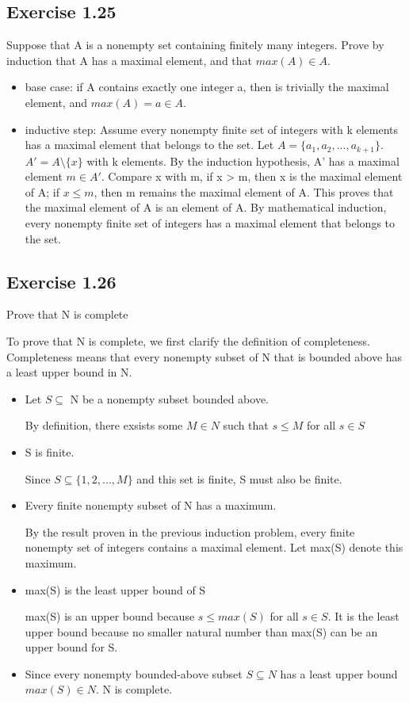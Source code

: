 \documentclass[12pt]{article}
\begin{document}
		\subsection*{Exercise 1.25}
			Suppose that A is a nonempty set containing finitely many integers. Prove by induction that A has a maximal element, and that $max(A) \in A$.
			\begin{itemize}
				\item base case: if A contains exactly one integer a, then is trivially the maximal element, and $max(A) = a \in A$.
				\item inductive step: Assume every nonempty finite set of integers with k elements has a maximal element that belongs to the set. Let $A = \{a_1, a_2, ..., a_{k+1}\}$. $A' = A \setminus \{x\}$ with k elements. By the induction hypothesis, A' has a maximal element $m \in A'$. Compare x with m, if x > m, then x is the maximal element of A; if $x \le m$, then m remains the maximal element of A. This proves that the maximal element of A is an element of A. By mathematical induction, every nonempty finite set of integers has a maximal element that belongs to the set.
			\end{itemize}
		\subsection*{Exercise 1.26}
			Prove that N is complete
			
			To prove that N is complete, we first clarify the definition of completeness. Completeness means that every nonempty subset of N that is bounded above has a least upper bound in N.
			\begin{itemize}
				\item Let $S \subseteq$ N be a nonempty subset bounded above. 
				
				By definition, there exsists some $M \in N$ such that $s \le M$ for all $s \in S$
				\item S is finite. 
				
				Since $S \subseteq \{1,2,...,M\}$ and this set is finite, S must also be finite.
				\item Every finite nonempty subset of N has a maximum.
				
				By the result proven in the previous induction problem, every finite nonempty set of integers contains a maximal element. Let max(S) denote this maximum.
				\item max(S) is the least upper bound of S
				
				max(S) is an upper bound because $s \le max(S)$ for all $s \in S$. It is the least upper bound because no smaller natural number than max(S) can be an upper bound for S.
				\item Since every nonempty bounded-above subset $S \subseteq N$ has a least upper bound $max(S) \in N$. N is complete.
			\end{itemize}
\end{document}
